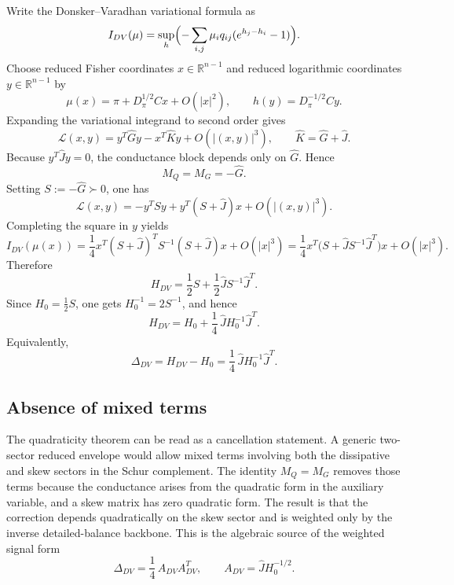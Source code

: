 \documentclass[11pt,a4paper]{article}
\numberwithin{equation}{section}
\theoremstyle{thmcompact}
\theoremstyle{remark}
\begin{document}
Write the Donsker--Varadhan variational formula as \cite{DonskerVaradhan1975a,DonskerVaradhan1975b,Touchette2009}
\begin{equation}
I_{DV}(\mu)=\sup_h\Bigl(-\sum_{i,j}\mu_i q_{ij}(e^{h_j-h_i}-1)\Bigr).
\end{equation}
Choose reduced Fisher coordinates \(x\in\mathbb R^{n-1}\) and reduced logarithmic coordinates \(y\in\mathbb R^{n-1}\) by
\begin{equation}
\mu(x)=\pi+D_\pi^{1/2}Cx+O(|x|^2),
\qquad
h(y)=D_\pi^{-1/2}Cy.
\end{equation}
Expanding the variational integrand to second order gives
\begin{equation}
\mathcal L(x,y)=y^T\widehat G y-x^T\widehat K y+O(|(x,y)|^3),
\qquad
\widehat K=\widehat G+\widehat J.
\end{equation}
Because \(y^T\widehat J y=0\), the conductance block depends only on \(\widehat G\). Hence
\begin{equation}
M_Q=M_G=-\widehat G.
\end{equation}
Setting \(S:=-\widehat G\succ 0\), one has
\begin{equation}
\mathcal L(x,y)=-y^TSy+y^T(S+\widehat J)x+O(|(x,y)|^3).
\end{equation}
Completing the square in \(y\) yields
\begin{equation}
I_{DV}(\mu(x))
=
\frac14 x^T(S+\widehat J)^TS^{-1}(S+\widehat J)x+O(|x|^3)
=
\frac14 x^T\bigl(S+\widehat J S^{-1}\widehat J^T\bigr)x+O(|x|^3).
\end{equation}
Therefore
\begin{equation}
H_{DV}=\frac12S+\frac12\widehat J S^{-1}\widehat J^T.
\end{equation}
Since \(H_0=\frac12S\), one gets \(H_0^{-1}=2S^{-1}\), and hence
\begin{equation}
H_{DV}=H_0+\frac14\,\widehat J H_0^{-1}\widehat J^T.
\end{equation}
Equivalently,
\begin{equation}
\Delta_{DV}=H_{DV}-H_0=\frac14\,\widehat J H_0^{-1}\widehat J^T.
\end{equation}

\subsection{Absence of mixed terms}

The quadraticity theorem can be read as a cancellation statement. A generic two-sector reduced envelope would allow mixed terms involving both the dissipative and skew sectors in the Schur complement. The identity \(M_Q=M_G\) removes those terms because the conductance arises from the quadratic form in the auxiliary variable, and a skew matrix has zero quadratic form. The result is that the correction depends quadratically on the skew sector and is weighted only by the inverse detailed-balance backbone. This is the algebraic source of the weighted signal form
\begin{equation}
\Delta_{DV}=\frac14\,A_{DV}A_{DV}^T,
\qquad
A_{DV}=\widehat J H_0^{-1/2}.
\end{equation}
\end{document}
